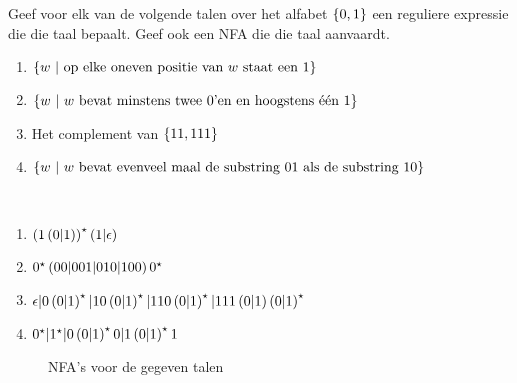 \documentclass[a4paper]{article}
\begin{document}
\begin{question}
Geef voor elk van de volgende talen over het alfabet $\left\{ 0,1 \right\}$ een reguliere expressie die die taal bepaalt. Geef ook een NFA die die taal aanvaardt.
\begin{enumerate}
  \item $\left\{ w\ |\ \mbox{op elke oneven positie van $w$ staat een $1$} \right\}$
  \item $\left\{ w\ |\ \mbox{$w$ bevat minstens twee $0$'en en hoogstens \'e\'en $1$} \right\}$
  \item Het complement van $\left\{ 11,111 \right\}$
  \item $\left\{ w\ |\ \mbox{$w$ bevat evenveel maal de substring $01$ als de substring $10$} \right\}$
\end{enumerate}
\begin{answer}~~
\begin{enumerate}
  \item $\left( 1\left( 0|1 \right) \right)^{\star}\left( 1|\epsilon \right)$
  \item $0^{\star}\left( 00|001|010|100 \right)0^{\star}$
  \item $\epsilon|0\left( 0|1 \right)^{\star}|10\left( 0|1 \right)^{\star}|110\left( 0|1 \right)^{\star}|111\left( 0|1 \right)\left( 0|1 \right)^{\star}$
  \item $0^{\star}|1^{\star}|0\left( 0|1 \right)^{\star}0|1\left( 0|1 \right)^{\star}1$
\end{enumerate}
\begin{figure}
\caption{NFA's voor de gegeven talen}
\end{figure}
\end{answer}
\end{question}
\end{document}
